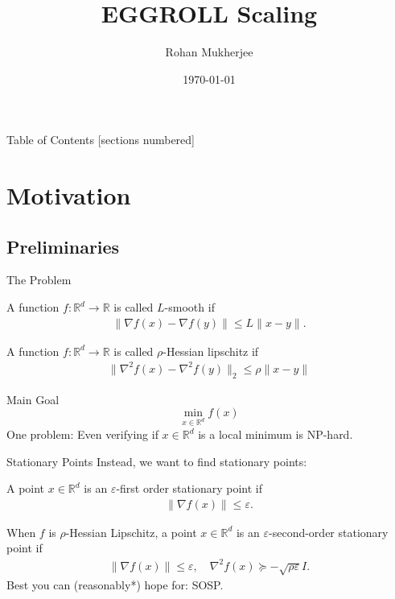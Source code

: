 \documentclass[10pt]{beamer}
\title{EGGROLL Scaling}
\date{\today}
\author{Rohan Mukherjee}
\institute{University of Oxford}
\def\mbb#1{\mathbb{#1}}
\def \R{\mbb{R}}
\def \ve{\varepsilon}
\newcommand{\mg}[1]{\| #1 \|}
\renewcommand{\grad}{\nabla}
\newcommand{\1}{\mathbbm{1}}
\begin{document}
\maketitle

\begin{frame}{Table of Contents}
  [sections numbered]
  \tableofcontents[hideallsubsections]
\end{frame}

\section{Motivation}

\subsection{Preliminaries}
\begin{frame}{The Problem}
    \begin{definition}[]
    A function $f: \R^d \to \R$ is called $L$-smooth if 
    \begin{align*}
        \| \grad f(x) - \grad f(y) \| \leq L \| x-y \|.
    \end{align*}    
    \end{definition}

    \begin{definition}[]
        A function $f: \R^d \to \R$ is called $\rho$-Hessian lipschitz if
        \begin{align*}
            \| \grad^2 f(x) - \grad^2 f(y) \|_2 \leq \rho \|x-y \|
        \end{align*}
    \end{definition}

    \begin{block}{Main Goal}
    \[
    \min_{x\in\mathbb{R}^d} f(x) 
    \]
    One problem: Even verifying if $x \in \R^d$ is a local minimum is NP-hard. 
    \end{block}
\end{frame}

\begin{frame}{Stationary Points}
    Instead, we want to find stationary points:
    \begin{definition}[]
        A point $x \in \R^{d}$ is an $\ve$-first order stationary point if 
        \begin{align*}
            \mg{\grad f(x)} \leq \ve.
        \end{align*}
    \end{definition}
    \begin{definition}[]
        When $f$ is $\rho$-Hessian Lipschitz, a point $x \in \R^d$ is an $\ve$-second-order stationary point if 
        \begin{align*}
            \mg{\grad f(x)} \leq \ve , \quad \grad^2 f(x) \succeq -\sqrt{\rho \ve} I.
        \end{align*}
        Best you can (reasonably*) hope for: SOSP.
    \end{definition}
\end{frame}
\end{document}
